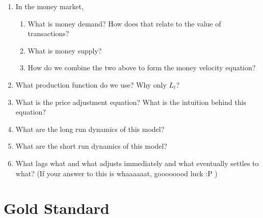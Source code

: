 \documentclass[11pt]{scrartcl}
\begin{document}
\begin{enumerate}
\item In the money market,
\begin{enumerate}
\item What is money demand? How does that relate to the value of transactions?
\item What is money supply?
\item How do we combine the two above to form the money velocity equation? 
\end{enumerate}
\item What production function do we use? Why only $L_t$?
\item What is the price adjustment equation? What is the intuition behind this equation? 
\item What are the long run dynamics of this model?
\item What are the short run dynamics of this model?
\item What lags what and what adjusts immediately and what eventually settles to what? (If your answer to this is whaaaaaat, goooooood luck :P )
\end{enumerate}

\section{Gold Standard}
\end{document}
